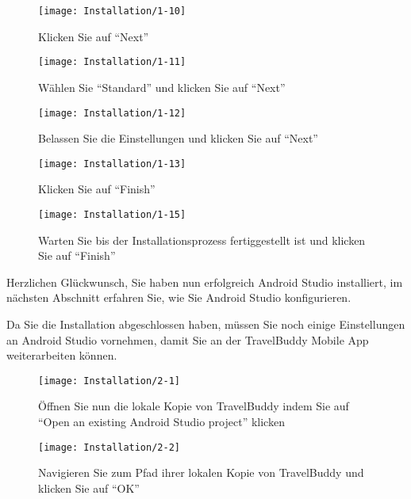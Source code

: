 \begin{figure}
  \centering
  \begin{minipage}[b]{0.48\textwidth}
    \texttt{[image: Installation/1-10]}
    \caption{Klicken Sie auf ``Next''}
  \end{minipage}
  \hfill
  \begin{minipage}[b]{0.48\textwidth}
    \texttt{[image: Installation/1-11]}
    \caption{Wählen Sie ``Standard'' und klicken Sie auf ``Next''}
  \end{minipage}
\end{figure}

\begin{figure}
  \centering
  \begin{minipage}[b]{0.48\textwidth}
    \texttt{[image: Installation/1-12]}
    \caption{Belassen Sie die Einstellungen und klicken Sie auf ``Next''}
  \end{minipage}
  \hfill
  \begin{minipage}[b]{0.48\textwidth}
    \texttt{[image: Installation/1-13]}
    \caption{Klicken Sie auf ``Finish''}
  \end{minipage}
\end{figure}

\begin{figure}
  \centering
  \texttt{[image: Installation/1-15]}
  \caption{Warten Sie bis der Installationsprozess fertiggestellt ist und klicken Sie auf ``Finish''}
\end{figure}

Herzlichen Glückwunsch, Sie haben nun erfolgreich Android Studio installiert, im nächsten Abschnitt erfahren Sie, wie Sie Android Studio konfigurieren.


Da Sie die Installation abgeschlossen haben, müssen Sie noch einige Einstellungen an Android Studio vornehmen, damit Sie an der TravelBuddy Mobile App weiterarbeiten können.

\begin{figure}
  \centering
  \begin{minipage}[b]{0.48\textwidth}
    \texttt{[image: Installation/2-1]}
    \caption{Öffnen Sie nun die lokale Kopie von TravelBuddy indem Sie auf ``Open an existing Android Studio project'' klicken}
  \end{minipage}
  \hfill
  \begin{minipage}[b]{0.48\textwidth}
    \texttt{[image: Installation/2-2]}
    \caption{Navigieren Sie zum Pfad ihrer lokalen Kopie von TravelBuddy und klicken Sie auf ``OK''}
  \end{minipage}
\end{figure}

